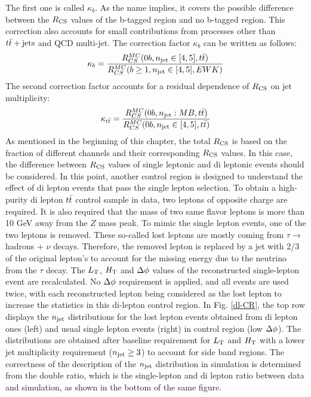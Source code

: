 The first one is called $\kappa_b$. As the name implies, it covers the possible difference between the $R_{\rm CS}$ values of the b-tagged region and no b-tagged region. This correction also accounts for small contributions from processes other than $t\bar{t}+\textrm{jets}$ and QCD multi-jet. The correction factor $\kappa_b$ can be written as follows:
\begin{equation}
\label{eq:kappaB}
{\kappa_b} = \frac{R_{CS}^{MC}(0b , n_{\rm jet} \in [4,5] , t\bar{t} )}{R_{CS}^{MC}(b \geq 1 , n_{\rm jet} \in [4,5] , EWK )} 
\end{equation}
The second correction factor accounts for a residual dependence of $R_{\rm CS}$ on jet multiplicity:
\begin{equation}
\label{eq:kappatt}
{\kappa_{\ensuremath{t\bar{t}}}} = \frac{R_{CS}^{MC}(0b , n_{\rm jet}: MB , t\bar{t} )}{R_{CS}^{MC}(0b , n_{\rm jet} \in [4,5] , t\bar{t} )} 
\end{equation}
As mentioned in the beginning of this chapter, the total $R_{\rm CS}$ is based on the fraction of different channels and their corresponding $R_{\rm CS}$ values. In this case, the difference between $R_{\rm CS}$ values of single leptonic and di leptonic events should be considered. In this point, another control region is designed to understand the effect of di lepton events that pass the single lepton selection. To obtain a high-purity di lepton $t\bar{t}$ control sample in data, two leptons of opposite charge are required. It is also required that the mass of two same flavor leptons is more than 10 GeV away from the $Z$ mass peak. To mimic the single lepton events, one of the two leptons is removed. 
These so-called lost leptons are mostly coming from $\tau \rightarrow$ hadrons + $\nu$ decays. Therefore, the removed lepton is replaced by a jet with 2/3 of the original lepton's \pt to account for the missing energy due to the neutrino from the $\tau$ decay.  The $L_{\rm T}$, $H_{\rm T}$ and $\Delta \phi$ values of the reconstructed single-lepton event are recalculated.
No $\Delta \phi$ requirement is applied, and all events are used twice, with each reconstructed lepton being considered as the lost lepton to increase the statistics in this di-lepton control region.
In Fig. \ref{dl-CR}, the top row displays the $n_{\rm jet}$ distributions for the lost lepton events obtained from di lepton ones (left) and usual single lepton events (right) in control region (low $\Delta \phi$). The distributions are obtained after baseline requirement for $L_{\rm T}$ and $H_{\rm T}$ with a lower jet multiplicity requirement ($n_{\rm jet} \geq 3$) to account for side band regions. The correctness of the description of the $n_{\rm jet}$ distribution in simulation is determined from the double ratio, which is the single-lepton and di lepton ratio between data and simulation, as shown in the bottom of the same figure.
